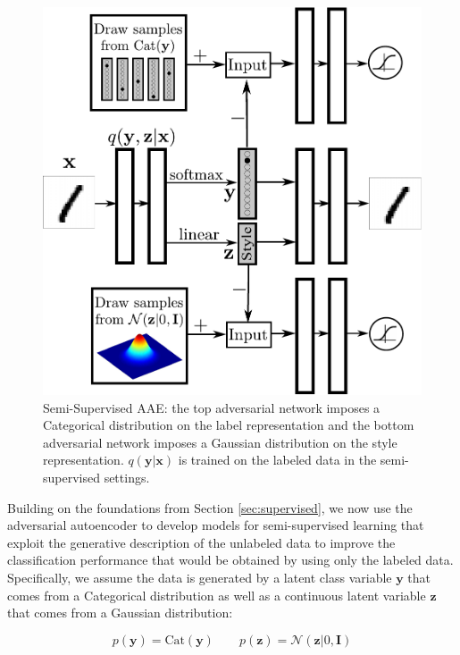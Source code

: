 \documentclass{article}
\begin{document}
\begin{figure}[b]
\begin{center}
\centering 
\includegraphics[scale=.4]{adv_ae_style_label}
\caption{\label{fig_semi_aae}Semi-Supervised AAE: the top adversarial network imposes a Categorical distribution on the label representation and the bottom adversarial network imposes a Gaussian distribution on the style representation. $q(\mathbf{y}|\mathbf{x})$ is trained on the labeled data in the semi-supervised settings. }
\end{center}
\end{figure}


Building on the foundations from Section \ref{sec:supervised}, we now use the adversarial autoencoder to develop models for semi-supervised learning that exploit the generative description of the unlabeled data to improve the classification performance that would be obtained by using only the labeled data. Specifically, we assume the data is generated by a latent class variable $\mathbf{y}$ that comes from a Categorical distribution as well as a continuous latent variable $\mathbf{z}$ that comes from a Gaussian distribution:

$$p(\mathbf{y}) = \text{Cat}(\mathbf{y}) \qquad  p(\mathbf{\mathbf{z}}) = \mathcal{N}(\mathbf{z}|0,\mathbf{I})$$
\end{document}
